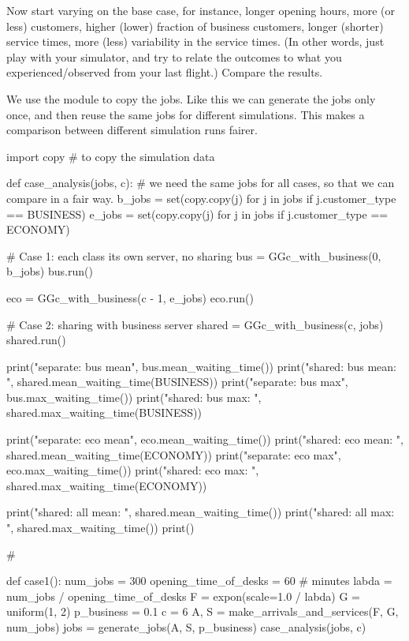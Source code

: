 \begin{exercise}
  Now start varying on the base case, for instance, longer opening hours, more (or less) customers, higher (lower) fraction of business customers, longer (shorter) service times, more (less) variability in the service times.  (In other words, just play with your simulator, and try to relate the outcomes to what you experienced/observed from your last flight.) Compare the results.

  \begin{solution}
    We use the  module to copy the jobs.
    Like this we can generate the jobs only once, and then reuse the same jobs for different simulations.
    This makes a comparison between different simulation runs fairer.

    \begin{pyverbatim}
import copy  # to copy the simulation data


def case_analysis(jobs, c):
    # we need the same jobs for all cases, so that we can compare in a fair way.
    b_jobs = set(copy.copy(j) for j in jobs if j.customer_type == BUSINESS)
    e_jobs = set(copy.copy(j) for j in jobs if j.customer_type == ECONOMY)

    # Case 1: each class its own server, no sharing
    bus = GGc_with_business(0, b_jobs)
    bus.run()

    eco = GGc_with_business(c - 1, e_jobs)
    eco.run()

    # Case 2: sharing with business server
    shared = GGc_with_business(c, jobs)
    shared.run()

    print("separate: bus mean", bus.mean_waiting_time())
    print("shared: bus mean: ", shared.mean_waiting_time(BUSINESS))
    print("separate: bus max", bus.max_waiting_time())
    print("shared: bus max: ", shared.max_waiting_time(BUSINESS))

    print("separate: eco mean", eco.mean_waiting_time())
    print("shared: eco mean: ", shared.mean_waiting_time(ECONOMY))
    print("separate: eco max", eco.max_waiting_time())
    print("shared: eco max: ", shared.max_waiting_time(ECONOMY))

    print("shared: all mean: ", shared.mean_waiting_time())
    print("shared: all max: ", shared.max_waiting_time())
    print()


# %


def case1():
    num_jobs = 300
    opening_time_of_desks = 60  # minutes
    labda = num_jobs / opening_time_of_desks
    F = expon(scale=1.0 / labda)
    G = uniform(1, 2)
    p_business = 0.1
    c = 6
    A, S = make_arrivals_and_services(F, G, num_jobs)
    jobs = generate_jobs(A, S, p_business)
    case_analysis(jobs, c)



\end{pyverbatim}
\end{solution}
\end{exercise}
